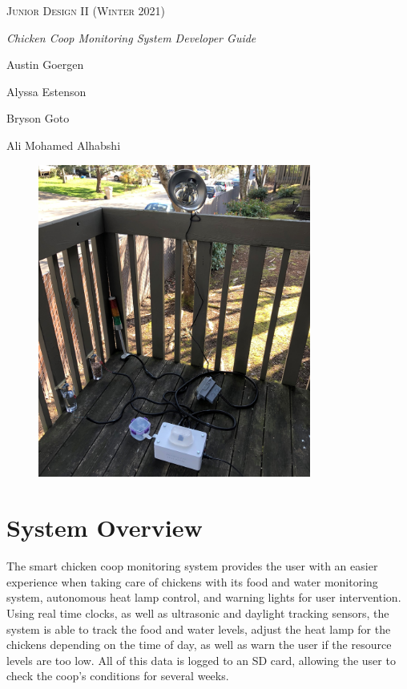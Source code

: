 \documentclass{article}
\begin{document}
\begin{centering}

{\scshape\Large {Junior Design II (Winter 2021)} \par}
\vspace{2cm}

{\huge\textit{Chicken Coop Monitoring System Developer Guide} \par}
\vspace{.5cm}

{\large{Austin Goergen}\par}
{\large{Alyssa Estenson}\par}
{\large{Bryson Goto}\par}
{\large{Ali Mohamed Alhabshi}\par}
\vspace{3cm}

\begin{figure}[H]
    \centering
    \includegraphics[width=0.8\textwidth]{fig/cover-photo.jpg}
\end{figure}


\vspace{.3cm}


\end{centering}

\pagebreak

\section{System Overview}
The smart chicken coop monitoring system provides the user with an easier experience when taking care of chickens with its food and water monitoring system, autonomous heat lamp control, and warning lights for user intervention. Using real time clocks, as well as ultrasonic and daylight tracking sensors, the system is able to track the food and water levels, adjust the heat lamp for the chickens depending on the time of day, as well as warn the user if the resource levels are too low. All of this data is logged to an SD card, allowing the user to check the coop's conditions for several weeks.
\end{document}
